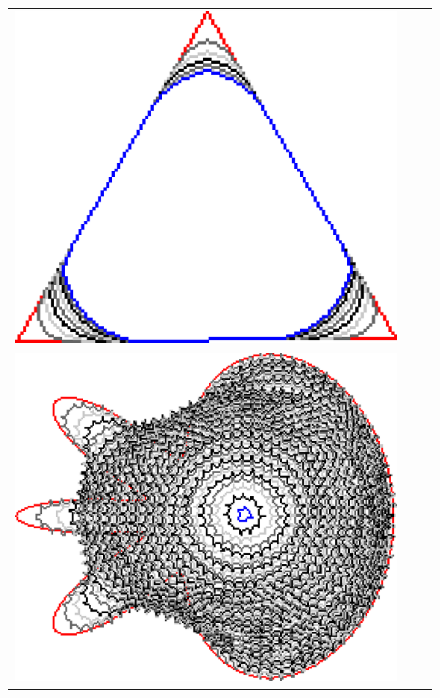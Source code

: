 \begin{figure}
\begin{tabular}{ccc}
\includegraphics[scale=0.22]{figures/chapter6/level-effect/triangle/improve/len_pen0/radius-5/level5/summary.pdf}\\[2em]
\includegraphics[scale=0.22]{figures/chapter6/level-effect/flower/improve/len_pen0/radius-5/level1/summary.pdf} &

\end{tabular}
\end{figure}
